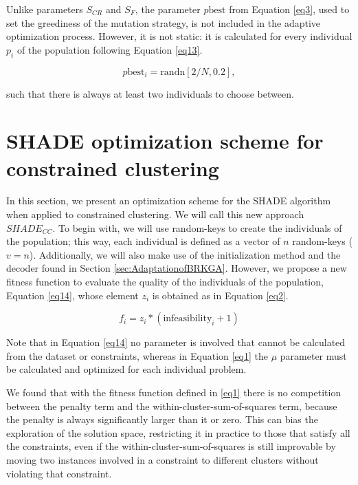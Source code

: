 \documentclass[review]{elsarticle}
\begin{document}
Unlike parameters $S_{CR}$ and $S_F$, the parameter $p\text{best}$ from Equation \eqref{eq3}, used to set the greediness of the mutation strategy, is not included in the adaptive optimization process. However, it is not static: it is calculated for every individual $p_i$ of the population following Equation \eqref{eq13}.

\begin{equation}
p\text{best}_i = \text{randn}[2/N, 0.2],
\label{eq13}
\end{equation}

\noindent such that there is always at least two individuals to choose between.

\section{SHADE optimization scheme for constrained clustering} \label{sec:SHADEadapt}

In this section, we present an optimization scheme for the SHADE algorithm when applied to constrained clustering. We will call this new approach $SHADE_{CC}$. To begin with, we will use random-keys to create the individuals of the population; this way, each individual is defined as a vector of $n$ random-keys ($v = n$). Additionally, we will also make use of the initialization method and the decoder found in Section \ref{sec:AdaptationofBRKGA}. However, we propose a new fitness function to evaluate the quality of the individuals of the population, Equation \eqref{eq14}, whose element $z_i$ is obtained as in Equation \eqref{eq2}.

\begin{equation}
f_i = z_i * (\text{infeasibility}_i + 1)
\label{eq14}
\end{equation}

Note that in Equation \eqref{eq14} no parameter is involved that cannot be calculated from the dataset or constraints, whereas in Equation \eqref{eq1} the $\mu$ parameter must be calculated and optimized for each individual problem.

We found that with the fitness function defined in \eqref{eq1} there is no competition between the penalty term and the within-cluster-sum-of-squares term, because the penalty is always significantly larger than it or zero. This can bias the exploration of the solution space, restricting it in practice to those that satisfy all the constraints, even if the within-cluster-sum-of-squares is still improvable by moving two instances involved in a constraint to different clusters without violating that constraint.
\end{document}
